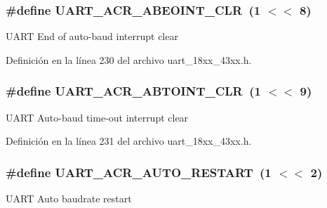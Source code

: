 \subsubsection[{\texorpdfstring{U\+A\+R\+T\+\_\+\+A\+C\+R\+\_\+\+A\+B\+E\+O\+I\+N\+T\+\_\+\+C\+LR}{UART_ACR_ABEOINT_CLR}}]{\setlength{\rightskip}{0pt plus 5cm}\#define U\+A\+R\+T\+\_\+\+A\+C\+R\+\_\+\+A\+B\+E\+O\+I\+N\+T\+\_\+\+C\+LR~(1 $<$$<$ 8)}\hypertarget{group___u_a_r_t__18_x_x__43_x_x_ga77450ebf0f86b6b7ea363927f0cd40c2}{}\label{group___u_a_r_t__18_x_x__43_x_x_ga77450ebf0f86b6b7ea363927f0cd40c2}
U\+A\+RT End of auto-\/baud interrupt clear 

Definición en la línea 230 del archivo uart\+\_\+18xx\+\_\+43xx.\+h.

\subsubsection[{\texorpdfstring{U\+A\+R\+T\+\_\+\+A\+C\+R\+\_\+\+A\+B\+T\+O\+I\+N\+T\+\_\+\+C\+LR}{UART_ACR_ABTOINT_CLR}}]{\setlength{\rightskip}{0pt plus 5cm}\#define U\+A\+R\+T\+\_\+\+A\+C\+R\+\_\+\+A\+B\+T\+O\+I\+N\+T\+\_\+\+C\+LR~(1 $<$$<$ 9)}\hypertarget{group___u_a_r_t__18_x_x__43_x_x_ga2e12222f359d7a5a41668cd729b0731d}{}\label{group___u_a_r_t__18_x_x__43_x_x_ga2e12222f359d7a5a41668cd729b0731d}
U\+A\+RT Auto-\/baud time-\/out interrupt clear 

Definición en la línea 231 del archivo uart\+\_\+18xx\+\_\+43xx.\+h.

\subsubsection[{\texorpdfstring{U\+A\+R\+T\+\_\+\+A\+C\+R\+\_\+\+A\+U\+T\+O\+\_\+\+R\+E\+S\+T\+A\+RT}{UART_ACR_AUTO_RESTART}}]{\setlength{\rightskip}{0pt plus 5cm}\#define U\+A\+R\+T\+\_\+\+A\+C\+R\+\_\+\+A\+U\+T\+O\+\_\+\+R\+E\+S\+T\+A\+RT~(1 $<$$<$ 2)}\hypertarget{group___u_a_r_t__18_x_x__43_x_x_ga20674ae8e687d2161ef3fd88f2649036}{}\label{group___u_a_r_t__18_x_x__43_x_x_ga20674ae8e687d2161ef3fd88f2649036}
U\+A\+RT Auto baudrate restart 

